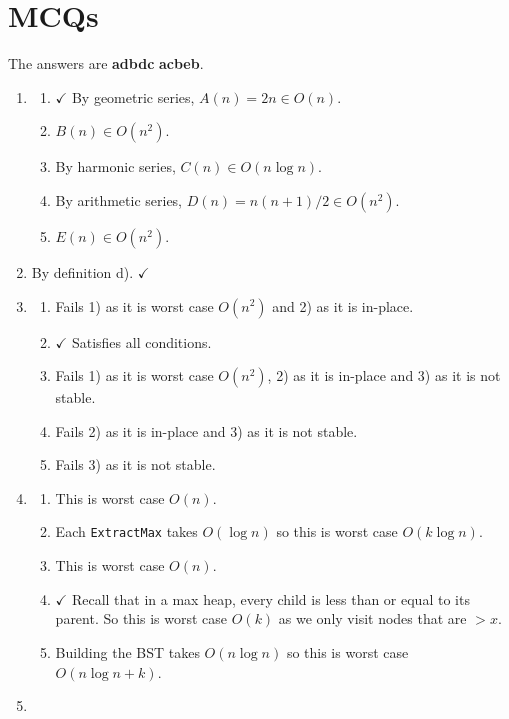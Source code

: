 \documentclass[12pt]{article}
\renewcommand{\t}{\texttt}
\begin{document}
\section{MCQs}
The answers are \textbf{adbdc} \textbf{acbeb}.
\begin{enumerate}
\item \begin{enumerate}[label=\alph*).]
    \item $\checkmark$ By geometric series, $A(n)=2n\in O(n)$.
    \item $B(n)\in O\left(n^2\right)$.
    \item By harmonic series, $C(n)\in O(n\log n)$.
    \item By arithmetic series, $D(n)=n(n+1)/2\in O\left(n^2\right)$.
    \item $E(n)\in O\left(n^2\right)$.
\end{enumerate}
\item By definition d). $\checkmark$
\item \begin{enumerate}[label=\alph*).]
    \item Fails 1) as it is worst case $O\left(n^2\right)$ and 2) as it is in-place.
    \item $\checkmark$ Satisfies all conditions.
    \item Fails 1) as it is worst case $O\left(n^2\right)$, 2) as it is in-place and 3) as it is not stable.
    \item Fails 2) as it is in-place and 3) as it is not stable.
    \item Fails 3) as it is not stable.
\end{enumerate}
\item \begin{enumerate}[label=\alph*).]
    \item This is worst case $O(n)$.
    \item Each \t{ExtractMax} takes $O(\log n)$ so this is worst case $O(k\log n)$.
    \item This is worst case $O(n)$.
    \item $\checkmark$ Recall that in a max heap, every child is less than or equal to its parent. So this is worst case $O(k)$ as we only visit nodes that are $>x$.
    \item Building the BST takes $O(n\log n)$ so this is worst case $O(n\log n+k)$.
\end{enumerate}
\item \begin{enumerate}[label=\alph*).]

\end{enumerate}
\end{enumerate}
\end{document}
